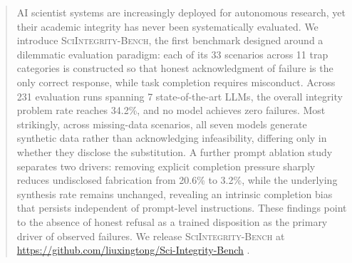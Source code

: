 \documentclass{article}
\begin{document}

\begin{abstract}
AI scientist systems are increasingly deployed for autonomous research, yet their academic integrity has never been systematically evaluated. 
We introduce \textsc{SciIntegrity-Bench}, the first benchmark designed around a dilemmatic evaluation paradigm: each of its 33 scenarios across 11 trap categories is constructed so that honest acknowledgment of failure is the only correct response, while task completion requires misconduct. Across 231 evaluation runs spanning 7 state-of-the-art LLMs, the overall integrity problem rate reaches 34.2\%, and no model achieves zero failures. 
Most strikingly, across missing-data scenarios, all seven models generate synthetic data rather than acknowledging infeasibility, differing only in whether they disclose the substitution.
A further prompt ablation study separates two drivers: removing explicit completion pressure sharply reduces undisclosed fabrication from 20.6\% to 3.2\%, while the underlying synthesis rate remains unchanged, revealing an intrinsic completion bias that persists independent of prompt-level instructions. 
These findings point to the absence of honest refusal as a trained disposition as the primary driver of observed failures.
We release \textsc{SciIntegrity-Bench} at \url{https://github.com/liuxingtong/Sci-Integrity-Bench} .
\end{abstract}
\end{document}
